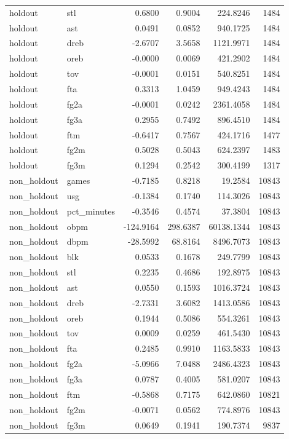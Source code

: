 \begin{table}
\begin{tabular}{llrrrr}
holdout & stl & 0.6800 & 0.9004 & 224.8246 & 1484 \\
holdout & ast & 0.0491 & 0.0852 & 940.1725 & 1484 \\
holdout & dreb & -2.6707 & 3.5658 & 1121.9971 & 1484 \\
holdout & oreb & -0.0000 & 0.0069 & 421.2902 & 1484 \\
holdout & tov & -0.0001 & 0.0151 & 540.8251 & 1484 \\
holdout & fta & 0.3313 & 1.0459 & 949.4243 & 1484 \\
holdout & fg2a & -0.0001 & 0.0242 & 2361.4058 & 1484 \\
holdout & fg3a & 0.2955 & 0.7492 & 896.4510 & 1484 \\
holdout & ftm & -0.6417 & 0.7567 & 424.1716 & 1477 \\
holdout & fg2m & 0.5028 & 0.5043 & 624.2397 & 1483 \\
holdout & fg3m & 0.1294 & 0.2542 & 300.4199 & 1317 \\
non\_holdout & games & -0.7185 & 0.8218 & 19.2584 & 10843 \\
non\_holdout & usg & -0.1384 & 0.1740 & 114.3026 & 10843 \\
non\_holdout & pct\_minutes & -0.3546 & 0.4574 & 37.3804 & 10843 \\
non\_holdout & obpm & -124.9164 & 298.6387 & 60138.1344 & 10843 \\
non\_holdout & dbpm & -28.5992 & 68.8164 & 8496.7073 & 10843 \\
non\_holdout & blk & 0.0533 & 0.1678 & 249.7799 & 10843 \\
non\_holdout & stl & 0.2235 & 0.4686 & 192.8975 & 10843 \\
non\_holdout & ast & 0.0550 & 0.1593 & 1016.3724 & 10843 \\
non\_holdout & dreb & -2.7331 & 3.6082 & 1413.0586 & 10843 \\
non\_holdout & oreb & 0.1944 & 0.5086 & 554.3261 & 10843 \\
non\_holdout & tov & 0.0009 & 0.0259 & 461.5430 & 10843 \\
non\_holdout & fta & 0.2485 & 0.9910 & 1163.5833 & 10843 \\
non\_holdout & fg2a & -5.0966 & 7.0488 & 2486.4323 & 10843 \\
non\_holdout & fg3a & 0.0787 & 0.4005 & 581.0207 & 10843 \\
non\_holdout & ftm & -0.5868 & 0.7175 & 642.0860 & 10821 \\
non\_holdout & fg2m & -0.0071 & 0.0562 & 774.8976 & 10843 \\
non\_holdout & fg3m & 0.0649 & 0.1941 & 190.7374 & 9837 \\
\bottomrule
\end{tabular}
\end{table}
